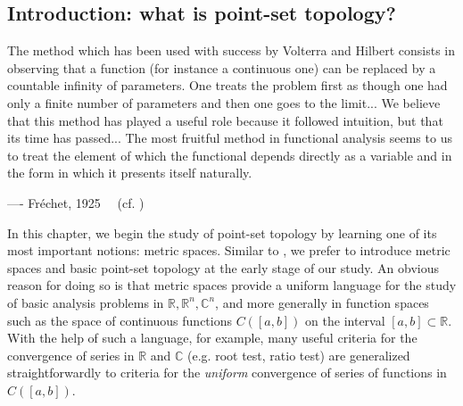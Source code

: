 \documentclass[12pt,b5paper,notitlepage]{article}
\theoremstyle{definition}
\theoremstyle{plain}
\newcommand{\Cbb}{\mathbb C}
\newcommand{\Rbb}{\mathbb R}
\numberwithin{equation}{section}
\begin{document}
\subsection{Introduction: what is point-set topology?}\label{lb55}


\begin{displayquote}
\small The method which has been used with success by Volterra and Hilbert consists in observing that a function (for instance a continuous one) can be replaced by a countable infinity of parameters. One treats the problem first as though one had only a finite number of parameters and then one goes to the limit... We believe that this method has played a useful role because it followed intuition, but that its time has passed... The most fruitful method in functional analysis seems to us to treat the element of which the functional depends directly as a variable and in the form in which it presents itself naturally.

\hfill ---- Fr\'echet, 1925 ~~(cf. \cite[Sec. 13.8]{Jah})
\end{displayquote}




In this chapter, we begin the study of point-set topology by learning one of its most important notions: metric spaces. Similar to \cite{Rud-P}, we prefer to introduce metric spaces and basic point-set topology at the early stage of our study. An obvious reason for doing so is that metric spaces provide a uniform language for the study of basic analysis problems in $\Rbb,\Rbb^n,\Cbb^n$, and more generally in function spaces such as the space of continuous functions $C([a,b])$ on the interval $[a,b]\subset\Rbb$. With the help of such a language, for example, many useful criteria for the convergence of series in $\Rbb$ and $\Cbb$ (e.g. root test, ratio test) are generalized straightforwardly to criteria for the \emph{uniform} convergence of series of functions in $C([a,b])$.
\end{document}
